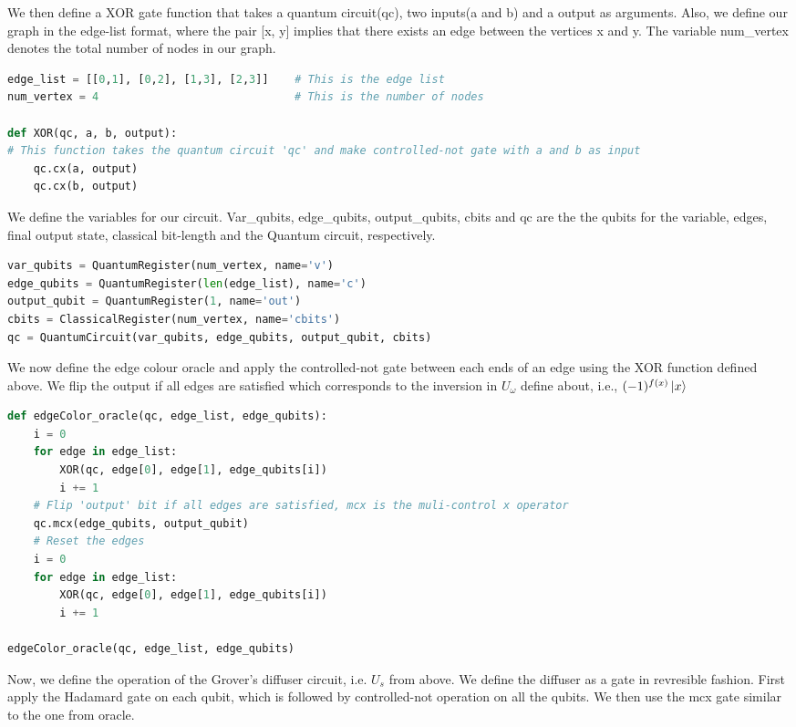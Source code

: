 \documentclass{article}
\begin{document}
We then define a XOR gate function that takes a quantum circuit(qc), two inputs(a and b) and a output as arguments. Also, we define our graph in the edge-list format, where the pair [x, y] implies that there exists an edge between the vertices x and y. The variable num\_vertex denotes the total number of nodes in our graph.

\begin{lstlisting}[language=Python]
edge_list = [[0,1], [0,2], [1,3], [2,3]]    # This is the edge list
num_vertex = 4                              # This is the number of nodes

def XOR(qc, a, b, output):
# This function takes the quantum circuit 'qc' and make controlled-not gate with a and b as input
    qc.cx(a, output)
    qc.cx(b, output)
\end{lstlisting}

We define the variables for our circuit. Var\_qubits, edge\_qubits, output\_qubits, cbits and qc are the the qubits for the variable, edges, final output state, classical bit-length and the Quantum circuit, respectively.

\begin{lstlisting}[language=Python]
var_qubits = QuantumRegister(num_vertex, name='v')
edge_qubits = QuantumRegister(len(edge_list), name='c')
output_qubit = QuantumRegister(1, name='out')
cbits = ClassicalRegister(num_vertex, name='cbits')
qc = QuantumCircuit(var_qubits, edge_qubits, output_qubit, cbits)
\end{lstlisting}

We now define the edge colour oracle and apply the controlled-not gate between each ends of an edge using the XOR function defined above. We flip the output if all edges are satisfied which corresponds to the inversion in $U_\omega$ define about, i.e., $(-1)^{f(x)} \ket{x}$

\begin{lstlisting}[language=Python]
def edgeColor_oracle(qc, edge_list, edge_qubits):
    i = 0
    for edge in edge_list:
        XOR(qc, edge[0], edge[1], edge_qubits[i])
        i += 1
    # Flip 'output' bit if all edges are satisfied, mcx is the muli-control x operator
    qc.mcx(edge_qubits, output_qubit)
    # Reset the edges
    i = 0
    for edge in edge_list:
        XOR(qc, edge[0], edge[1], edge_qubits[i])
        i += 1

edgeColor_oracle(qc, edge_list, edge_qubits)
\end{lstlisting}

Now, we define the operation of the Grover's diffuser circuit, i.e. $U_s$ from above. We define the diffuser as a gate in revresible fashion. First apply the Hadamard gate on each qubit, which is followed by controlled-not operation on all the qubits. We then use the mcx gate similar to the one from oracle.
\end{document}
